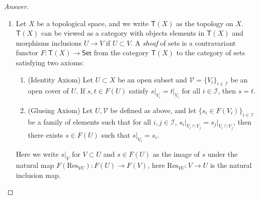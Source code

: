 \documentclass[12pt]{amsart}
\begin{document}
\begin{proof}
	[Answer]\begin{enumerate}
		\item Let $X$ be a topological space, and we write $\mathsf{T} (X)$ as the topology on $X$. $\mathsf{T} (X)$ can be viewed as a category with objects elements in $\mathsf{T} (X)$ and morphisms inclusions $U\rightarrow V$ if $U\subset V$. A \emph{sheaf} of sets is a contravariant functor $F\colon\mathsf{T} (X)\to\mathsf{Set} $ from the category $\mathsf{T} (X)$ to the category of sets satisfying two axioms:
		\begin{enumerate}
			\item (Identity Axiom) Let $U\subset X$ be an open subset and $\mathcal{V} =\{V_i\}_{i\in\mathcal{I} } $ be an open cover of $U$. If $s,t\in F(U)$ satisfy $s\vert_{V_i } =t\vert_{V_i } $ for all $i\in\mathcal{I} $, then $s=t$.
			\item (Glueing Axiom) Let $U,\mathcal{V} $ be defined as above, and let $\{s_i\in F(V_i )\}_{i\in\mathcal{I} } $ be a family of elements such that for all $i,j\in\mathcal{I} $, $s_i\vert_{V_i\cap V_j }=s_j\vert_{V_i\cap V_j} $, then there exists $s\in F(U)$ such that $s\vert_{V_i } =s_i  $.
		\end{enumerate}
	Here we write $s\vert_V $ for $V\subset U$ and $s\in F(U)$ as the image of $s$ under the natural map $F(\mathrm{Res}_{VU} )\colon F(U)\to F(V)$, here $\mathrm{Res}_{VU}\colon V\to U$ is the natural inclusion map.


\end{enumerate}
\end{proof}
\end{document}
